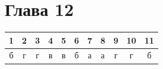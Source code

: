 \vspace{4mm}

\section*{Глава 12}

\noindent
\begin{tabular}{ccccccccccc}
\toprule
1 & 2 & 3 & 4 & 5 & 6 & 7 & 8 & 9 & 10 & 11 \\
\midrule
б & г & г & в & в & б & а & а & г & г & б \\
\bottomrule
\end{tabular}

\vspace{4mm}

